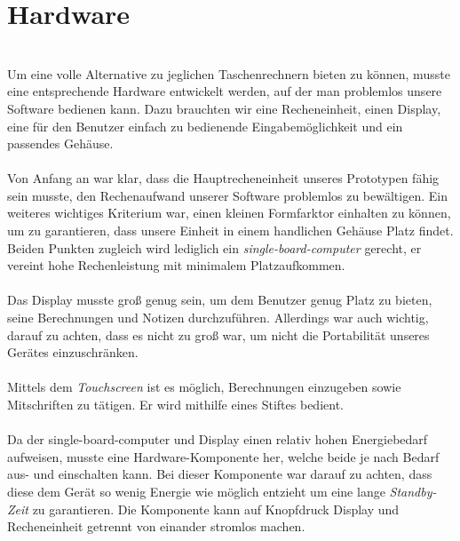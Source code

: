\section{Hardware}\ \\
Um eine volle Alternative zu jeglichen Taschenrechnern bieten zu können, musste eine entsprechende Hardware entwickelt werden, auf der man problemlos unsere Software bedienen kann. Dazu brauchten wir eine Recheneinheit, einen Display, eine für den Benutzer einfach zu bedienende Eingabemöglichkeit und ein passendes Gehäuse.\\
\\
Von Anfang an war klar, dass die Hauptrecheneinheit unseres Prototypen fähig sein musste, den Rechenaufwand unserer Software problemlos zu bewältigen. Ein weiteres wichtiges Kriterium war, einen kleinen Formfarktor einhalten zu können, um zu garantieren, dass unsere Einheit in einem handlichen Gehäuse Platz findet. Beiden Punkten zugleich wird lediglich ein \textit{single-board-computer} gerecht, er vereint hohe Rechenleistung mit minimalem Platzaufkommen.\\
\\
Das Display musste groß genug sein, um dem Benutzer genug Platz zu bieten, seine Berechnungen und Notizen durchzuführen. Allerdings war auch wichtig, darauf zu achten, dass es nicht zu groß war, um nicht die Portabilität unseres Gerätes einzuschränken.\\
\\
Mittels dem \textit{Touchscreen} ist es möglich, Berechnungen einzugeben sowie Mitschriften zu tätigen. Er wird mithilfe eines Stiftes bedient.\\
\\
Da der single-board-computer und Display einen relativ hohen Energiebedarf aufweisen, musste eine Hardware-Komponente her, welche beide je nach Bedarf aus- und einschalten kann. Bei dieser Komponente war darauf zu achten, dass diese dem Gerät so wenig Energie wie möglich entzieht um eine lange \textit{Standby-Zeit} zu garantieren. Die Komponente kann auf Knopfdruck Display und Recheneinheit getrennt von einander stromlos machen.\\

